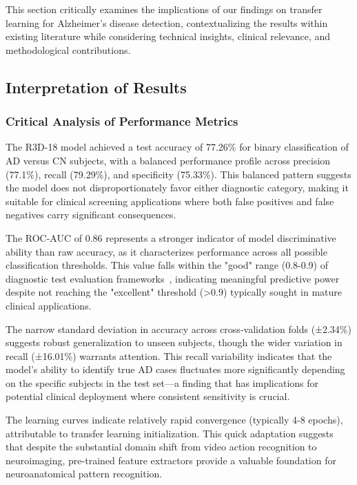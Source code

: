 \documentclass[12pt, a4paper]{article}
\begin{document}
This section critically examines the implications of our findings on transfer learning for Alzheimer's disease detection, contextualizing the results within existing literature while considering technical insights, clinical relevance, and methodological contributions.

\subsection{Interpretation of Results}

\subsubsection{Critical Analysis of Performance Metrics}

The R3D-18 model achieved a test accuracy of 77.26\% for binary classification of AD versus CN subjects, with a balanced performance profile across precision (77.1\%), recall (79.29\%), and specificity (75.33\%). This balanced pattern suggests the model does not disproportionately favor either diagnostic category, making it suitable for clinical screening applications where both false positives and false negatives carry significant consequences.

The ROC-AUC of 0.86 represents a stronger indicator of model discriminative ability than raw accuracy, as it characterizes performance across all possible classification thresholds. This value falls within the "good" range (0.8-0.9) of diagnostic test evaluation frameworks~\cite{mandrekar2010receiver}, indicating meaningful predictive power despite not reaching the "excellent" threshold (>0.9) typically sought in mature clinical applications.

The narrow standard deviation in accuracy across cross-validation folds (±2.34\%) suggests robust generalization to unseen subjects, though the wider variation in recall (±16.01\%) warrants attention. This recall variability indicates that the model's ability to identify true AD cases fluctuates more significantly depending on the specific subjects in the test set—a finding that has implications for potential clinical deployment where consistent sensitivity is crucial.

The learning curves indicate relatively rapid convergence (typically 4-8 epochs), attributable to transfer learning initialization. This quick adaptation suggests that despite the substantial domain shift from video action recognition to neuroimaging, pre-trained feature extractors provide a valuable foundation for neuroanatomical pattern recognition.
\end{document}
